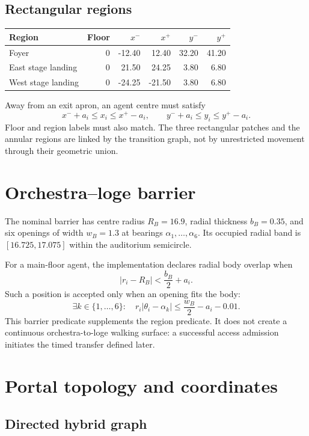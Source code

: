 \documentclass[11pt]{article}
\begin{document}
\subsection{Rectangular regions}

\begin{center}
\begin{tabular}{lrrrrr}
\toprule
Region & Floor & $x^-$ & $x^+$ & $y^-$ & $y^+$\\
\midrule
Foyer              & 0 & -12.40 & 12.40 & 32.20 & 41.20\\
East stage landing & 0 & 21.50  & 24.25 & 3.80 & 6.80\\
West stage landing & 0 & -24.25 & -21.50 & 3.80 & 6.80\\
\bottomrule
\end{tabular}
\end{center}
Away from an exit apron, an agent centre must satisfy
\[
 x^-+a_i\leq x_i\leq x^+-a_i,\qquad
 y^-+a_i\leq y_i\leq y^+-a_i.
\]
Floor and region labels must also match. The three rectangular patches and
the annular regions are linked by the transition graph, not by unrestricted
movement through their geometric union.

\section{Orchestra--loge barrier}

The nominal barrier has centre radius $R_B=16.9$, radial thickness $b_B=0.35$,
and six openings of width $w_B=1.3$ at bearings $\alpha_1,\ldots,\alpha_6$.
Its occupied radial band is $[16.725,17.075]$ within the auditorium semicircle.

For a main-floor agent, the implementation declares radial body overlap when
\[
 |r_i-R_B|<\frac{b_B}{2}+a_i.
\]
Such a position is accepted only when an opening fits the body:
\[
 \exists k\in\{1,\ldots,6\}:\quad
       r_i|\theta_i-\alpha_k|\leq\frac{w_B}{2}-a_i-0.01.
\]
This barrier predicate supplements the region predicate. It does not create
a continuous orchestra-to-loge walking surface: a successful access admission
initiates the timed transfer defined later.

\section{Portal topology and coordinates}

\subsection{Directed hybrid graph}
\end{document}
